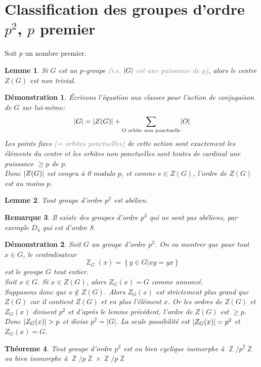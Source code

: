 \documentclass[a4paper, oneside]{report}
\theoremstyle{break}
\newtheorem{thm}{Théoreme}[section] %
\newtheorem{lemme}[thm]{Lemme}
\newtheorem{remarque}[thm]{Remarque}
\newtheorem*{demonstration}{Démonstration}
\newcommand{\gray}[1]{\textcolor{gray}{#1}}
\DeclareMathOperator{\Z}{\mathbb{Z}}
\DeclarePairedDelimiter\ens{\left\{ }{\right\} }%
\DeclarePairedDelimiter\abs{\lvert}{\rvert}%
\renewcommand{\ens}[1]{\left\{ #1 \right\} }%
\newcommand{\Ens}{\ens}
\begin{document}
\section{Classification des groupes d'ordre \texorpdfstring{$p^2$, $p$ premier}{L}}

Soit $p$ un nombre premier.

\begin{lemme}
Si $G$ est un $p$-groupe \gray{(i.e. $\abs{G}$ est une puissance de $p$)}, alors le centre $Z(G)$ est non trivial.
\end{lemme}

\begin{demonstration}
Écrivons l'équation aux classes pour l'action de conjugaison de $G$ sur lui-même:
\[
\abs{G} = \abs{Z(G)} + \sum_{O \;\text{orbite non ponctuelle}} \abs{O}
\]
Les points fixes \gray{(= orbites ponctuelles)} de cette action sont exactement les éléments du centre et les orbites non ponctuelles sont toutes de cardinal une puissance $\geq p$ de $p$.\\
Donc $\abs{Z(G)}$ est congru à 0 modulo $p$, et comme $e \in Z(G)$, l'ordre de $Z(G)$ est au moins $p$.
\end{demonstration}

\begin{lemme}
Tout groupe d'ordre $p^2$ est abélien.
\end{lemme}

\begin{remarque}
Il existe des groupes d'ordre $p^3$ qui ne sont pas abéliens, par exemple $D_4$ qui est d'ordre 8.
\end{remarque}

\begin{demonstration}
Soit $G$ un groupe d'ordre $p^2$. On va montrer que pour tout $x \in G$, le centralisateur 
\[
\Z_G(x) = \Ens{y \in G \big| xy = yx}
\]
est le groupe $G$ tout entier.\\
Soit $x \in G$. Si $x \in Z(G)$, alors $Z_G(x) = G$ comme annoncé.\\
Supposons donc que $x \notin Z(G)$. Alors $Z_G(x)$ est strictement plus grand que $Z(G)$ car il contient $Z(G)$ et en plus l'élément $x$. Or les ordres de $Z(G)$ et $Z_G(x)$ divisent $p^2$ et d'après le lemme précédent, l'ordre de $Z(G)$ est $\geq p$. Donc $\abs{Z_G(x)}>p$ et divise $p^2=|G|$. La seule possibilité est $\abs{Z_G(x)} = p^2$ et $Z_G(x)= G$.
\end{demonstration}

\begin{thm}
Tout groupe d'ordre $p^2$ est ou bien cyclique isomorphe à $\Z/p^2\Z$ ou bien isomorphe à $\Z/p\Z \times \Z/p\Z$
\end{thm}
\end{document}
